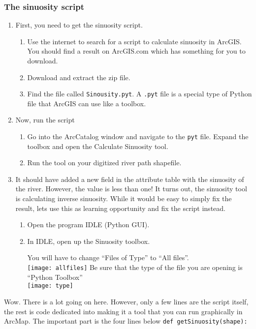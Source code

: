 \documentclass{article}
\begin{document}
\subsubsection{The sinuosity script}
\begin{enumerate}
    \item First, you need to get the sinuosity script.
        \begin{enumerate}
            \item Use the internet to search for a script to calculate sinuosity in ArcGIS.  You should find a result on ArcGIS.com which has something for you to download.
            \item Download and extract the zip file.  
            \item Find the file called \verb+Sinousity.pyt+.  A \verb+.pyt+ file is a special type of Python file that ArcGIS can use like a toolbox.  
        \end{enumerate}
    \item Now, run the script
        \begin{enumerate}
            \item Go into the ArcCatalog window and navigate to the \verb+pyt+ file.  Expand the toolbox and open the Calculate Sinuosity tool.  
            \item Run the tool on your digitized river path shapefile.  
        \end{enumerate}
    \item It should have added a new field in the attribute table with the sinuosity of the river.  However, the value is less than one!  It turns out, the sinuosity tool is calculating inverse sinuosity.  While it would be easy to simply fix the result, lets use this as learning opportunity and fix the script instead.  
        \begin{enumerate}
            \item Open the program IDLE (Python GUI).
            \item In IDLE, open up the Sinuosity toolbox.

                You will have to change ``Files of Type'' to ``All files''.
                \\\texttt{[image: allfiles]}
                Be sure that the type of the file you are opening is ``Python Toolbox''
                \\\texttt{[image: type]}
        \end{enumerate}
\end{enumerate}
\vspace{2mm}
Wow.  There is a lot going on here.  However, only a few lines are the script itself, the rest is code dedicated into making it a tool that you can run graphically in ArcMap.  The important part is the four lines below \verb+def getSinuosity(shape):+
\end{document}
